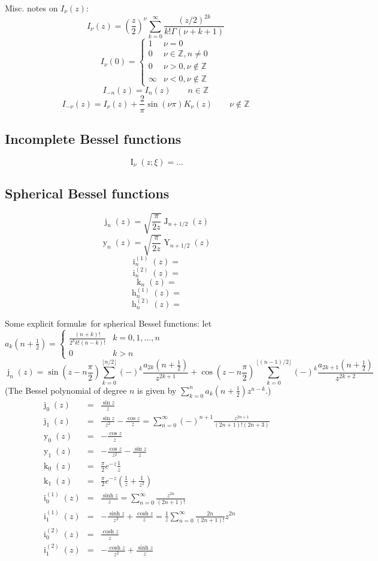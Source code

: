 \documentclass[10pt,dvipdfmx,letterpaper,twoside]{article}
\let\O=\operatorname
\newcommand{\ZZ}{{\mathbb{Z}}}
\let\Gam=\Gamma
\begin{document}
Misc. notes on $I_\nu(z)$:
\[ I_\nu(z) = \left(\frac{z}{2}\right)^\nu \sum_{k=0}^\infty \frac{(z/2)^{2k}}{k! \Gam(\nu+k+1)} \]
\[ I_\nu(0) = \begin{cases} 1 & \nu=0\\ 0 & \nu\in\ZZ, n\neq0\\ 0 & \nu>0,\nu\notin\ZZ\\ \infty & \nu<0,\nu\notin\ZZ\end{cases} \]
\[ I_{-n}(z) = I_{n}(z) \qquad n\in\ZZ \]
\[ I_{-\nu}(z) = I_{\nu}(z) + \frac{2}{\pi} \sin(\nu\pi) K_{\nu}(z) \qquad \nu\notin\ZZ \]

\subsection{Incomplete Bessel functions}

\[ \O{I}_\nu(z; \xi) = \dots \]

\subsection{Spherical Bessel functions}

\[ \O{j}_n(z) = \sqrt{\frac{\pi}{2z}} \O{J}_{n+1/2}(z) \]
\[ \O{y}_n(z) = \sqrt{\frac{\pi}{2z}} \O{Y}_{n+1/2}(z) \]
\[ \O{i}^{(1)}_n(z) = \]
\[ \O{i}^{(2)}_n(z) = \]
\[ \O{k}_n(z) = \]
\[ \O{h}^{(1)}_n(z) = \]
\[ \O{h}^{(2)}_n(z) = \]

Some explicit formul\ae\ for spherical Bessel functions:
let $a_k(n+\tfrac12) = \begin{cases}\frac{(n+k)!}{2^k k! (n-k)!} & k=0,1,\dots,n\\0&k>n\end{cases}$
\[ \O{j}_n(z) = \sin(z - n\frac\pi2)\sum_{k=0}^{\lfloor n/2\rfloor}(-)^k\frac{a_{2k}(n+\tfrac12)}{z^{2k+1}}
    + \cos(z - n\frac\pi2)\sum_{k=0}^{\lfloor (n-1)/2\rfloor}(-)^k\frac{a_{2k+1}(n+\tfrac12)}{z^{2k+2}} \]
(The Bessel polynomial of degree $n$ is given by $\sum_{k=0}^n a_k(n+\tfrac12)z^{n-k}$.)
\begin{eqnarray*}
\O{j}_0(z) &=& \frac{\sin z}{z} \\
\O{j}_1(z) &=& \frac{\sin z}{z^2} - \frac{\cos z}{z} = \sum_{n=0}^\infty (-)^{n+1}\frac{z^{2n+1}}{(2n+1)!(2n+3)} \\
\O{y}_0(z) &=& -\frac{\cos z}{z} \\
\O{y}_1(z) &=& -\frac{\cos z}{z^2} - \frac{\sin z}{z} \\
\O{k}_0(z) &=& \frac{\pi}{2} e^{-z} \frac{1}{z} \\
\O{k}_1(z) &=& \frac{\pi}{2} e^{-z} \left( \frac{1}{z} + \frac{1}{z^2} \right) \\
\O{i}^{(1)}_0(z) &=& \frac{\sinh z}{z} = \sum_{n=0}^\infty\frac{z^{2n}}{(2n+1)!} \\
\O{i}^{(1)}_1(z) &=& -\frac{\sinh z}{z^2} + \frac{\cosh z}{z} = \frac{1}{z}\sum_{n=0}^\infty\frac{2n}{(2n+1)!}z^{2n} \\
\O{i}^{(2)}_0(z) &=& \frac{\cosh z}{z} \\
\O{i}^{(2)}_1(z) &=& -\frac{\cosh z}{z^2} + \frac{\sinh z}{z}
\end{eqnarray*}
\end{document}
